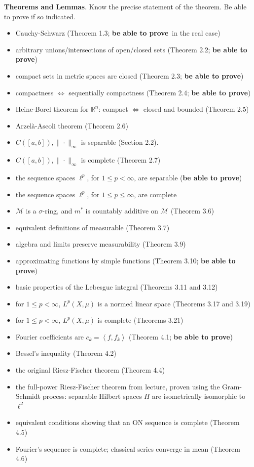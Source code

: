 \documentclass[12pt]{amsart}
\newcommand{\normalspacing}{\renewcommand{\baselinestretch}{1.1}\tiny\normalsize}
\newcommand{\cM}{\mathcal{M}}
\newcommand{\RR}{{\mathbb{R}}}
\newcommand{\ip}[2]{\left<#1,#2\right>}
\begin{document}
\normalspacing
\medskip
\noindent \textbf{Theorems and Lemmas}.  Know the precise statement of the theorem.  Be able to prove if so indicated.
\newcommand{\bap}{\textbf{be able to prove}}
\begin{itemize}
\item Cauchy-Schwarz (Theorem 1.3; \bap \, in the real case)
\item arbitrary unions/intersections of open/closed sets (Theorem 2.2; \bap)
\item compact sets in metric spaces are closed (Theorem 2.3; \bap)
\item compactness $\iff$ sequentially compactness (Theorem 2.4; \bap)
\item Heine-Borel theorem for $\RR^n$: compact $\iff$ closed and bounded (Theorem 2.5)
\item Arzel\`a-Ascoli theorem (Theorem 2.6)
\item $C([a,b]),\|\cdot\|_\infty$ is separable (Section 2.2).
\item $C([a,b]),\|\cdot\|_\infty$ is complete (Theorem 2.7)
\item the sequence spaces $\ell^p$, for $1\le p < \infty$, are separable (\bap)
\item the sequence spaces $\ell^p$, for $1\le p \le \infty$, are complete
\item $\cM$ is a $\sigma$-ring, and $m^*$ is countably additive on $\cM$ (Theorem 3.6)
\item equivalent definitions of measurable (Theorem 3.7)
\item algebra and limits preserve measurability (Theorem 3.9)
\item approximating functions by simple functions (Theorem 3.10; \bap)
\item basic properties of the Lebesgue integral (Theorems 3.11 and 3.12)
\item for $1\le p <\infty$, $L^p(X,\mu)$ is a normed linear space (Theorems 3.17 and 3.19)
\item for $1\le p <\infty$, $L^p(X,\mu)$ is complete (Theorems 3.21)
\item Fourier coefficients are $c_k=\ip{f}{f_k}$ (Theorem 4.1; \bap)
\item Bessel's inequality (Theorem 4.2)
\item the original Riesz-Fischer theorem (Theorem 4.4)
\item the full-power Riesz-Fischer theorem from lecture, proven using the Gram-Schmidt process: separable Hilbert spaces $H$ are isometrically isomorphic to $\ell^2$
\item equivalent conditions showing that an ON sequence is complete (Theorem 4.5)
\item Fourier's sequence is complete; classical series converge in mean (Theorem 4.6)
\end{itemize}
\end{document}
